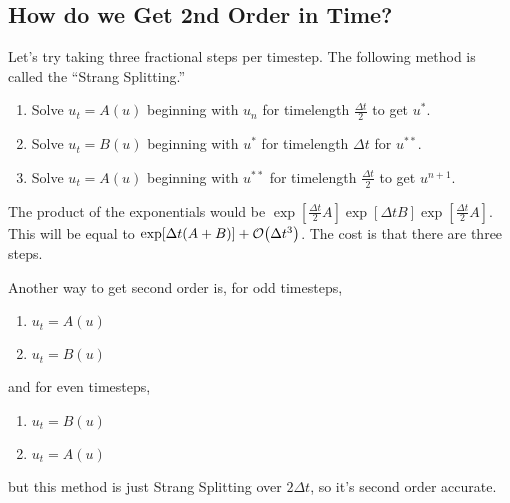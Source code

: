 \documentclass{article}
\newcommand{\Dt}{\Delta t}
\begin{document}
        \subsection{How do we Get 2nd Order in Time?}
            Let's try taking three fractional steps per timestep.  The following method is called the ``Strang Splitting.''
            \begin{enumerate}
                \item Solve $u_t = A(u)$ beginning with $u_n$ for timelength $\frac{\Dt}{2}$ to get $u^*$.
                \item Solve $u_t = B(u)$ beginning with $u^*$ for timelength $\Dt$ for $u^{**}$.
                \item Solve $u_t = A(u)$ beginning with $u^{**}$ for timelength $\frac{\Dt}{2}$ to get $u^{n+1}$.
            \end{enumerate}
            The product of the exponentials would be $\exp[\frac{\Dt}{2}A]\exp[\Dt B]\exp[\frac{\Dt}{2}A]$.  This will be equal to $\exp[\Dt(A + B)] + \order{\Dt^3}$.  The cost is that there are three steps.

            Another way to get second order is, for odd timesteps,
            \begin{enumerate}
                \item $u_t = A(u)$
                \item $u_t = B(u)$
            \end{enumerate}
            and for even timesteps,
            \begin{enumerate}
                \item $u_t = B(u)$
                \item $u_t = A(u)$
            \end{enumerate}
            but this method is just Strang Splitting over $2\Dt$, so it's second order accurate.
\end{document}
